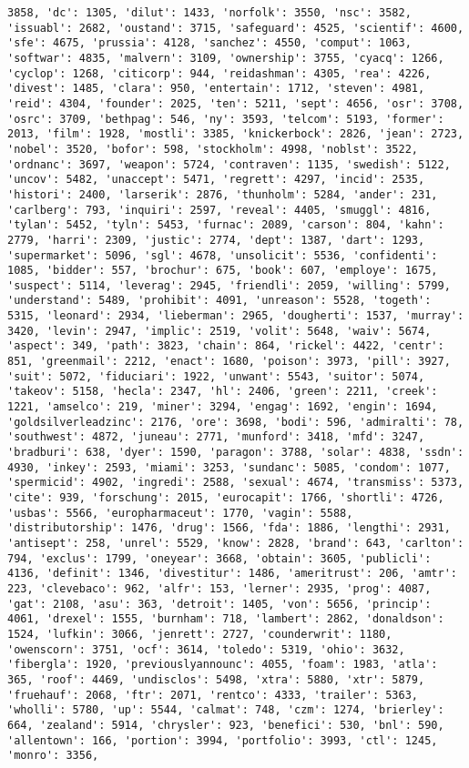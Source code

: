 \documentclass[11pt]{article}
\begin{document}
\begin{Verbatim}[commandchars=\\\{\}]
3858, 'dc': 1305, 'dilut': 1433, 'norfolk': 3550, 'nsc': 3582, 'issuabl': 2682, 'oustand': 3715, 'safeguard': 4525, 'scientif': 4600, 'sfe': 4675, 'prussia': 4128, 'sanchez': 4550, 'comput': 1063, 'softwar': 4835, 'malvern': 3109, 'ownership': 3755, 'cyacq': 1266, 'cyclop': 1268, 'citicorp': 944, 'reidashman': 4305, 'rea': 4226, 'divest': 1485, 'clara': 950, 'entertain': 1712, 'steven': 4981, 'reid': 4304, 'founder': 2025, 'ten': 5211, 'sept': 4656, 'osr': 3708, 'osrc': 3709, 'bethpag': 546, 'ny': 3593, 'telcom': 5193, 'former': 2013, 'film': 1928, 'mostli': 3385, 'knickerbock': 2826, 'jean': 2723, 'nobel': 3520, 'bofor': 598, 'stockholm': 4998, 'noblst': 3522, 'ordnanc': 3697, 'weapon': 5724, 'contraven': 1135, 'swedish': 5122, 'uncov': 5482, 'unaccept': 5471, 'regrett': 4297, 'incid': 2535, 'histori': 2400, 'larserik': 2876, 'thunholm': 5284, 'ander': 231, 'carlberg': 793, 'inquiri': 2597, 'reveal': 4405, 'smuggl': 4816, 'tylan': 5452, 'tyln': 5453, 'furnac': 2089, 'carson': 804, 'kahn': 2779, 'harri': 2309, 'justic': 2774, 'dept': 1387, 'dart': 1293, 'supermarket': 5096, 'sgl': 4678, 'unsolicit': 5536, 'confidenti': 1085, 'bidder': 557, 'brochur': 675, 'book': 607, 'employe': 1675, 'suspect': 5114, 'leverag': 2945, 'friendli': 2059, 'willing': 5799, 'understand': 5489, 'prohibit': 4091, 'unreason': 5528, 'togeth': 5315, 'leonard': 2934, 'lieberman': 2965, 'dougherti': 1537, 'murray': 3420, 'levin': 2947, 'implic': 2519, 'volit': 5648, 'waiv': 5674, 'aspect': 349, 'path': 3823, 'chain': 864, 'rickel': 4422, 'centr': 851, 'greenmail': 2212, 'enact': 1680, 'poison': 3973, 'pill': 3927, 'suit': 5072, 'fiduciari': 1922, 'unwant': 5543, 'suitor': 5074, 'takeov': 5158, 'hecla': 2347, 'hl': 2406, 'green': 2211, 'creek': 1221, 'amselco': 219, 'miner': 3294, 'engag': 1692, 'engin': 1694, 'goldsilverleadzinc': 2176, 'ore': 3698, 'bodi': 596, 'admiralti': 78, 'southwest': 4872, 'juneau': 2771, 'munford': 3418, 'mfd': 3247, 'bradburi': 638, 'dyer': 1590, 'paragon': 3788, 'solar': 4838, 'ssdn': 4930, 'inkey': 2593, 'miami': 3253, 'sundanc': 5085, 'condom': 1077, 'spermicid': 4902, 'ingredi': 2588, 'sexual': 4674, 'transmiss': 5373, 'cite': 939, 'forschung': 2015, 'eurocapit': 1766, 'shortli': 4726, 'usbas': 5566, 'europharmaceut': 1770, 'vagin': 5588, 'distributorship': 1476, 'drug': 1566, 'fda': 1886, 'lengthi': 2931, 'antisept': 258, 'unrel': 5529, 'know': 2828, 'brand': 643, 'carlton': 794, 'exclus': 1799, 'oneyear': 3668, 'obtain': 3605, 'publicli': 4136, 'definit': 1346, 'divestitur': 1486, 'ameritrust': 206, 'amtr': 223, 'clevebaco': 962, 'alfr': 153, 'lerner': 2935, 'prog': 4087, 'gat': 2108, 'asu': 363, 'detroit': 1405, 'von': 5656, 'princip': 4061, 'drexel': 1555, 'burnham': 718, 'lambert': 2862, 'donaldson': 1524, 'lufkin': 3066, 'jenrett': 2727, 'counderwrit': 1180, 'owenscorn': 3751, 'ocf': 3614, 'toledo': 5319, 'ohio': 3632, 'fibergla': 1920, 'previouslyannounc': 4055, 'foam': 1983, 'atla': 365, 'roof': 4469, 'undisclos': 5498, 'xtra': 5880, 'xtr': 5879, 'fruehauf': 2068, 'ftr': 2071, 'rentco': 4333, 'trailer': 5363, 'wholli': 5780, 'up': 5544, 'calmat': 748, 'czm': 1274, 'brierley': 664, 'zealand': 5914, 'chrysler': 923, 'benefici': 530, 'bnl': 590, 'allentown': 166, 'portion': 3994, 'portfolio': 3993, 'ctl': 1245, 'monro': 3356, 
\end{Verbatim}
\end{document}

